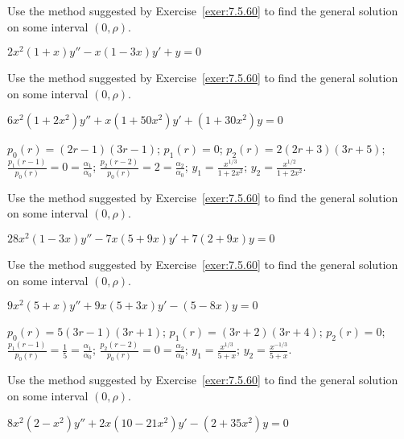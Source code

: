 \documentclass{ximera}
\begin{document}
\begin{problem}\label{exer:7.5.61}
Use the method
suggested by Exercise~\ref{exer:7.5.60} to find the general solution on
some interval $(0,\rho)$.

$2x^2(1+x)y''-x(1-3x)y'+y=0$
\end{problem}

\begin{problem}\label{exer:7.5.62}
Use the method
suggested by Exercise~\ref{exer:7.5.60} to find the general solution on
some interval $(0,\rho)$.

$6x^2(1+2x^2)y''+x(1+50x^2)y'+(1+30x^2)y=0$

\begin{solution}
    $p_0(r)=(2r-1)(3r-1)$;
$p_1(r)=0$;
$p_2(r)=2(2r+3)(3r+5)$;
$\frac{p_1(r-1)}{ p_0(r)}=0=\frac{\alpha_1}{\alpha_0}$;
$\frac{p_2(r-2)}{ p_0(r)}=2=\frac{\alpha_2}{\alpha_0}$;
$y_1=\frac{x^{1/3}}{1+2x^2}$; $y_2=\frac{x^{1/2}}{1+2x^2}$.
\end{solution}
\end{problem}

\begin{problem}\label{exer:7.5.63}
Use the method
suggested by Exercise~\ref{exer:7.5.60} to find the general solution on
some interval $(0,\rho)$.

$28x^2(1-3x)y''-7x(5+9x)y'+7(2+9x)y=0$
\end{problem}

\begin{problem}\label{exer:7.5.64}
Use the method
suggested by Exercise~\ref{exer:7.5.60} to find the general solution on
some interval $(0,\rho)$.

$9x^2(5+x)y''+9x(5+3x)y'-(5-8x)y=0$

\begin{solution}
    $p_0(r)=5(3r-1)(3r+1)$;
$p_1(r)=(3r+2)(3r+4)$;
$p_2(r)=0$;
$\frac{p_1(r-1)}{ p_0(r)}=\frac{1}{5}=\frac{\alpha_1}{\alpha_0}$;
$\frac{p_2(r-2)}{ p_0(r)}=0=\frac{\alpha_2}{\alpha_0}$;
$y_1=\frac{x^{1/3}}{5+x}$; $y_2=\frac{x^{-1/3}}{5+x}$.

\end{solution}
\end{problem}

\begin{problem}\label{exer:7.5.65}
Use the method
suggested by Exercise~\ref{exer:7.5.60} to find the general solution on
some interval $(0,\rho)$.

$8x^2(2-x^2)y''+2x(10-21x^2)y'-(2+35x^2)y=0$
\end{problem}
\end{document}

